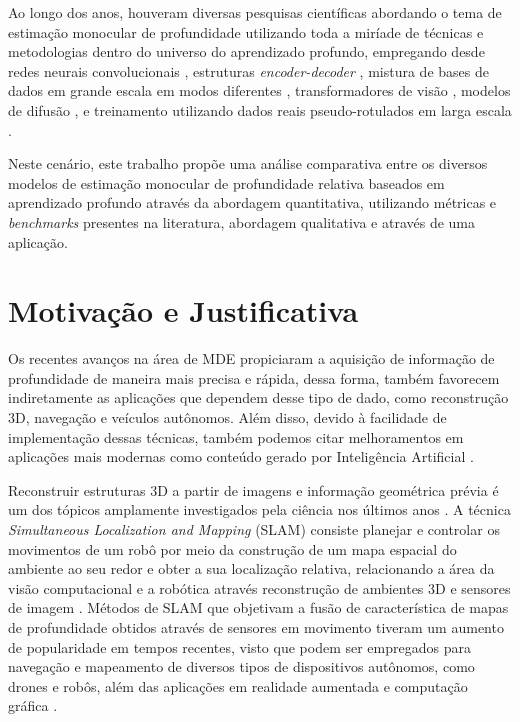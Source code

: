 Ao longo dos anos, houveram diversas pesquisas científicas abordando o tema de estimação monocular de profundidade utilizando toda a miríade de técnicas e metodologias dentro do universo do aprendizado profundo, empregando desde redes neurais convolucionais \cite{kopf2021robust}, estruturas \textit{encoder-decoder} \cite{godard2019digging}, mistura de bases de dados em grande escala em modos diferentes \cite{lasinger2019towards}, transformadores de visão \cite{birkl2023midas}, modelos de difusão \cite{ke2024repurposing}, e treinamento utilizando dados reais pseudo-rotulados em larga escala \cite{yang2024depth}. 

Neste cenário, este trabalho propõe uma análise comparativa entre os diversos modelos de estimação monocular de profundidade relativa baseados em aprendizado profundo através da abordagem quantitativa, utilizando métricas e \textit{benchmarks} presentes na literatura, abordagem qualitativa e através de uma aplicação. 



\section{Motivação e Justificativa} 

Os recentes avanços na área de MDE propiciaram a aquisição de informação de profundidade de maneira mais precisa e rápida, dessa forma, também favorecem indiretamente as aplicações que dependem desse tipo de dado, como reconstrução 3D, navegação e veículos autônomos. Além disso, devido à facilidade de implementação dessas técnicas, também podemos citar melhoramentos em aplicações mais modernas como conteúdo gerado por Inteligência Artificial \cite{yang2024depth}.


Reconstruir estruturas 3D a partir de imagens e informação geométrica prévia é um dos tópicos amplamente investigados pela ciência nos últimos anos \cite{zhao2020monocular}. A técnica \textit{Simultaneous Localization and Mapping} (SLAM) consiste planejar e controlar os movimentos de um robô por meio da construção de um mapa espacial do ambiente ao seu redor e obter a sua localização relativa, relacionando a área da visão computacional e a robótica através reconstrução de ambientes 3D e sensores de imagem \cite{placed2023survey} \cite{stachniss2016simultaneous}. Métodos de SLAM que objetivam a fusão de característica de mapas de profundidade obtidos através de sensores em movimento tiveram um aumento de popularidade em tempos recentes, visto que podem ser empregados para navegação e mapeamento de diversos tipos de dispositivos autônomos, como drones e robôs, além das aplicações em realidade aumentada e computação gráfica \cite{tateno2017cnn}.


